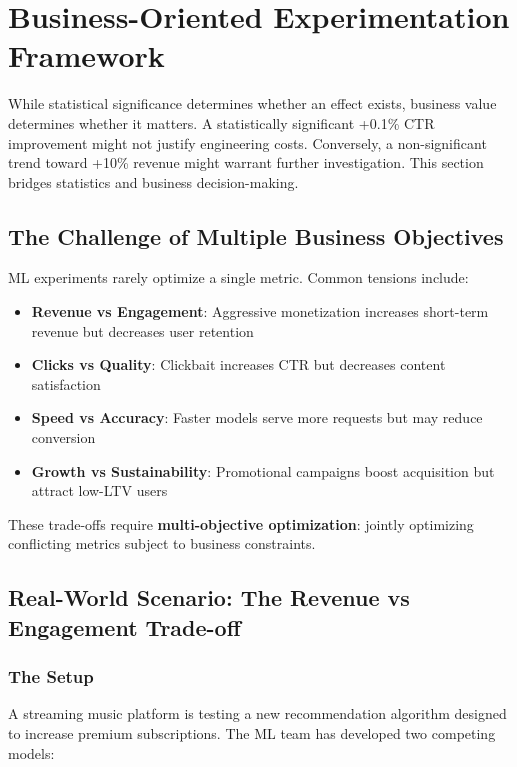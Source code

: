 \section{Business-Oriented Experimentation Framework}

While statistical significance determines whether an effect exists, business value determines whether it matters. A statistically significant +0.1\% CTR improvement might not justify engineering costs. Conversely, a non-significant trend toward +10\% revenue might warrant further investigation. This section bridges statistics and business decision-making.

\subsection{The Challenge of Multiple Business Objectives}

ML experiments rarely optimize a single metric. Common tensions include:

\begin{itemize}
    \item \textbf{Revenue vs Engagement}: Aggressive monetization increases short-term revenue but decreases user retention
    \item \textbf{Clicks vs Quality}: Clickbait increases CTR but decreases content satisfaction
    \item \textbf{Speed vs Accuracy}: Faster models serve more requests but may reduce conversion
    \item \textbf{Growth vs Sustainability}: Promotional campaigns boost acquisition but attract low-LTV users
\end{itemize}

These trade-offs require \textbf{multi-objective optimization}: jointly optimizing conflicting metrics subject to business constraints.

\subsection{Real-World Scenario: The Revenue vs Engagement Trade-off}

\subsubsection{The Setup}

A streaming music platform is testing a new recommendation algorithm designed to increase premium subscriptions. The ML team has developed two competing models:

